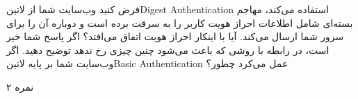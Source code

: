 
فرض کنید وب‌سایت شما از ‌لاتین{Digest Authentication} استفاده می‌کند، مهاجم بسته‌ای شامل اطلاعات احراز هویت کاربر را به سرقت برده است و دوباره آن را برای سرور شما ارسال می‌کند. آیا با اینکار احراز هویت اتفاق می‌افتد؟
اگر پاسخ شما خیر است، در رابطه با روشی که باعث می‌شود چنین چیزی رخ ندهد توضیح دهید.
اگر وب‌سایت شما بر پایه ‌لاتین{Basic Authentication} عمل می‌کرد چطور؟

۲ نمره
